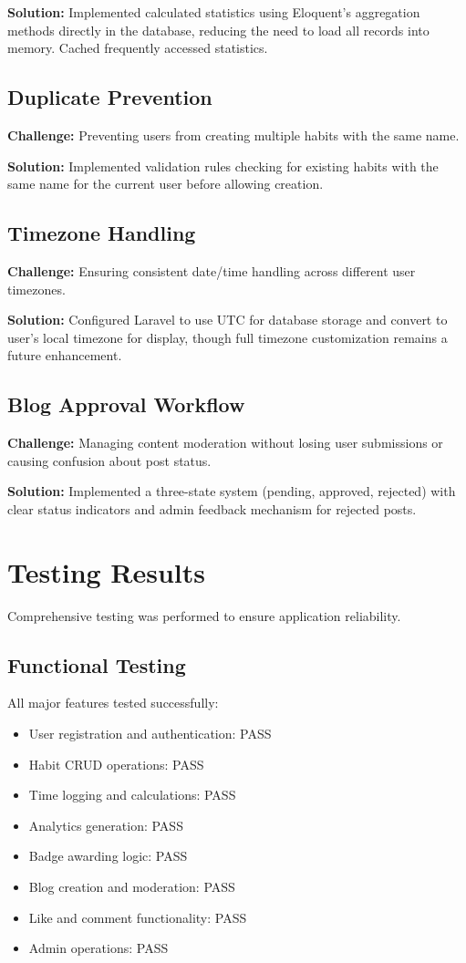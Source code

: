 \documentclass[12pt,a4paper]{report}
\newcommand{\JustifiedNormal}{\fontsize{12}{14}\selectfont\justifying\setlength{\parindent}{0pt}}
\begin{document}
\textbf{Solution:} Implemented calculated statistics using Eloquent's aggregation methods directly in the database, reducing the need to load all records into memory. Cached frequently accessed statistics.

\subsection{Duplicate Prevention}
\JustifiedNormal
\textbf{Challenge:} Preventing users from creating multiple habits with the same name.

\textbf{Solution:} Implemented validation rules checking for existing habits with the same name for the current user before allowing creation.

\subsection{Timezone Handling}
\JustifiedNormal
\textbf{Challenge:} Ensuring consistent date/time handling across different user timezones.

\textbf{Solution:} Configured Laravel to use UTC for database storage and convert to user's local timezone for display, though full timezone customization remains a future enhancement.

\subsection{Blog Approval Workflow}
\JustifiedNormal
\textbf{Challenge:} Managing content moderation without losing user submissions or causing confusion about post status.

\textbf{Solution:} Implemented a three-state system (pending, approved, rejected) with clear status indicators and admin feedback mechanism for rejected posts.

\section{Testing Results}
\JustifiedNormal
Comprehensive testing was performed to ensure application reliability.

\subsection{Functional Testing}
\JustifiedNormal
All major features tested successfully:
\begin{itemize}
  \item User registration and authentication: PASS
  \item Habit CRUD operations: PASS
  \item Time logging and calculations: PASS
  \item Analytics generation: PASS
  \item Badge awarding logic: PASS
  \item Blog creation and moderation: PASS
  \item Like and comment functionality: PASS
  \item Admin operations: PASS
\end{itemize}
\end{document}
